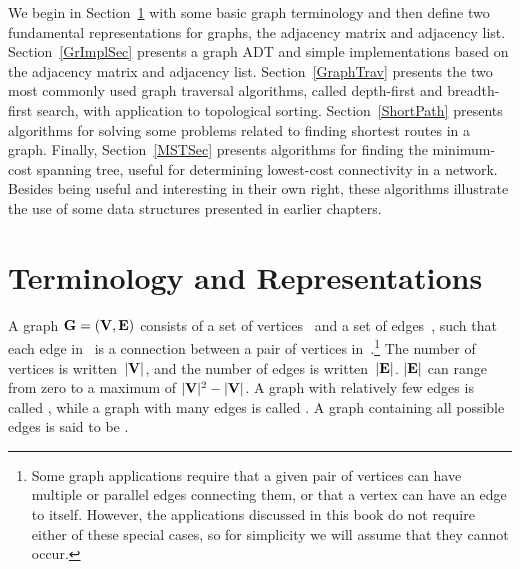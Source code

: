 We begin in Section~\ref{GraphDefRep} with some basic graph
terminology and then define two fundamental representations for
graphs, the adjacency matrix and adjacency list. 
Section~\ref{GrImplSec} presents a
graph ADT
and simple implementations based on the
adjacency matrix
and adjacency list.
Section~\ref{GraphTrav} presents the two most commonly used graph
traversal algorithms,
called depth-first and breadth-first
search, with
application to topological sorting.
Section~\ref{ShortPath} presents algorithms for solving some problems
related to finding shortest routes in a graph.
Finally, Section~\ref{MSTSec} presents algorithms for finding the
minimum-cost spanning tree, useful
for determining lowest-cost connectivity in a network.
Besides being useful and interesting in their own right, these
algorithms illustrate the use of some data structures presented
in earlier chapters.

\section{Terminology and Representations}
\label{GraphDefRep}

A graph \({\textbf{G}} = ({\textbf{V}}, {\textbf{E}})\) consists of a set of
vertices~ and a set of edges~, such
that each edge in~ is a connection between a pair of vertices
in~.\footnote{Some
graph applications require that a given pair of vertices can have
multiple or parallel edges connecting them,
or that a vertex can have an edge to itself.
However, the applications discussed in this book do not require either
of these special cases, so for simplicity we will assume that they
cannot occur.}
The number of vertices is written~\(|{\textbf{V}}|\), and the number of
edges is written~\(|{\textbf{E}}|\).
\(|{\textbf{E}}|\) can range from zero to a maximum of
\(|{\textbf{V}}|^2 - |{\textbf{V}}|\).
A graph with relatively few edges is called , while a
graph with many edges is called .
A graph containing all possible edges is said to be .

